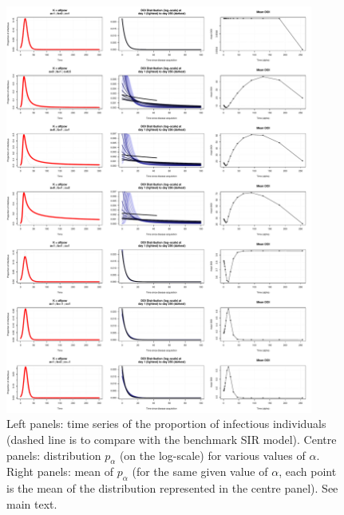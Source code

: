 \documentclass[12pt, twocolumn]{article}   	%
\begin{document}
\onecolumn

\begin{figure}[htpb]
\begin{center}
\includegraphics[width=0.9\textwidth]{plot_doid.pdf}

\caption{Left panels: time series of the proportion of infectious individuals (dashed line is to compare with the benchmark SIR model). Centre panels: distribution $p_\alpha$ (on the log-scale) for various values of $\alpha$. Right panels: mean of $p_\alpha$ (for the same given value of $\alpha$, each point is the mean of the distribution represented in the centre panel). See main text.}
\label{fig:results}
\end{center}
\end{figure}
\end{document}
